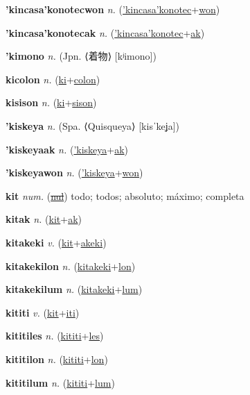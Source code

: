 \textbf{\hypertarget{'kincasa'konotecwon}{'kincasa'konotecwon}} \textit{n.} (\hyperlink{'kincasa'konotec}{'kincasa'konotec}+\allowbreak \hyperlink{won}{won})


\textbf{\hypertarget{'kincasa'konotecak}{'kincasa'konotecak}} \textit{n.} (\hyperlink{'kincasa'konotec}{'kincasa'konotec}+\allowbreak \hyperlink{ak}{ak})


\textbf{\hypertarget{'kimono}{'kimono}} \textit{n.} (Jpn. ⟨{\japanese{}着物}⟩ [kʲimono])


\textbf{\hypertarget{kicolon}{kicolon}} \textit{n.} (\hyperlink{ki}{ki}+\allowbreak \hyperlink{colon}{colon})


\textbf{\hypertarget{kisison}{kisison}} \textit{n.} (\hyperlink{ki}{ki}+\allowbreak \hyperlink{sison}{sison})


\textbf{\hypertarget{'kiskeya}{'kiskeya}} \textit{n.} (Spa. ⟨Quisqueya⟩ [kisˈkeʝa])


\textbf{\hypertarget{'kiskeyaak}{'kiskeyaak}} \textit{n.} (\hyperlink{'kiskeya}{'kiskeya}+\allowbreak \hyperlink{ak}{ak})


\textbf{\hypertarget{'kiskeyawon}{'kiskeyawon}} \textit{n.} (\hyperlink{'kiskeya}{'kiskeya}+\allowbreak \hyperlink{won}{won})


\textbf{\hypertarget{kit}{kit}} \textit{num.} (\hyperlink{nul}{\sout{nul}})
todo; todos; absoluto; máximo; completa

\textbf{\hypertarget{kitak}{kitak}} \textit{n.} (\hyperlink{kit}{kit}+\allowbreak \hyperlink{ak}{ak})


\textbf{\hypertarget{kitakeki}{kitakeki}} \textit{v.} (\hyperlink{kit}{kit}+\allowbreak \hyperlink{akeki}{akeki})


\textbf{\hypertarget{kitakekilon}{kitakekilon}} \textit{n.} (\hyperlink{kitakeki}{kitakeki}+\allowbreak \hyperlink{lon}{lon})


\textbf{\hypertarget{kitakekilum}{kitakekilum}} \textit{n.} (\hyperlink{kitakeki}{kitakeki}+\allowbreak \hyperlink{lum}{lum})


\textbf{\hypertarget{kititi}{kititi}} \textit{v.} (\hyperlink{kit}{kit}+\allowbreak \hyperlink{iti}{iti})


\textbf{\hypertarget{kititiles}{kititiles}} \textit{n.} (\hyperlink{kititi}{kititi}+\allowbreak \hyperlink{les}{les})


\textbf{\hypertarget{kititilon}{kititilon}} \textit{n.} (\hyperlink{kititi}{kititi}+\allowbreak \hyperlink{lon}{lon})


\textbf{\hypertarget{kititilum}{kititilum}} \textit{n.} (\hyperlink{kititi}{kititi}+\allowbreak \hyperlink{lum}{lum})


